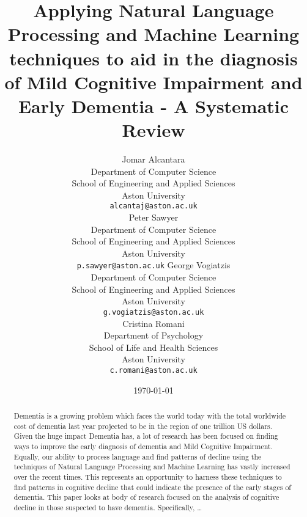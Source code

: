 \documentclass[12pt]{article}
\title{Applying Natural Language Processing and Machine Learning techniques to aid in the diagnosis of Mild Cognitive Impairment and Early Dementia - A Systematic Review}
\author{
	Jomar Alcantara \\
	Department of Computer Science\\
	School of Engineering and Applied Sciences\\
	Aston University\\
	\texttt{alcantaj@aston.ac.uk} \\
		\AND
	Peter Sawyer \\
	Department of Computer Science\\
	School of Engineering and Applied Sciences\\
	Aston University\\
	\texttt{p.sawyer@aston.ac.uk}
		\AND
	George Vogiatzis\\
	Department of Computer Science\\
	School of Engineering and Applied Sciences\\
	Aston University \\
	\texttt{g.vogiatzis@aston.ac.uk} \\
		\AND
	Cristina Romani\\
	Department of Psychology\\
	School of Life and Health Sciences\\
	Aston University \\
	\texttt{c.romani@aston.ac.uk}
}
\date{\today}
\begin{document}
\maketitle

\bigskip
\begin{abstract}
Dementia is a growing problem which faces the world today with the total worldwide cost of dementia last year projected to be in the region of one trillion US dollars. Given the huge impact Dementia has, a lot of research has been focused on finding ways to improve the early diagnosis of dementia and Mild Cognitive Impairment. Equally, our ability to process language and find patterns of decline using the techniques of Natural Language Processing and Machine Learning has vastly increased over the recent times. This represents an opportunity to harness these techniques to find patterns in cognitive decline that could indicate the presence of the early stages of dementia.  This paper looks at body of research focused on the analysis of cognitive decline in those suspected to have dementia. Specifically,   \ldots
\end{abstract}
\end{document}
